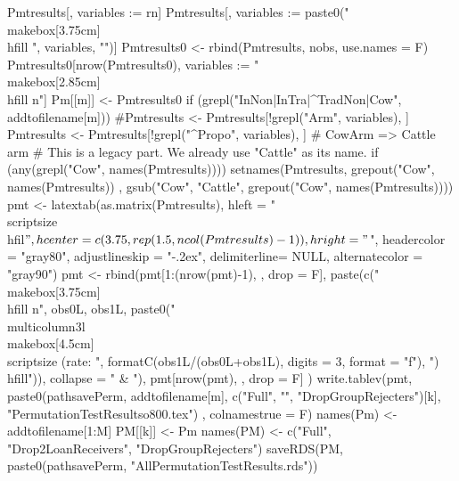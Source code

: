 \begin{Schunk}
\begin{Sinput}
{{    Pmtresults[, variables := rn]
    Pmtresults[, variables := paste0("\\makebox[3.75cm]{\\hfill ", variables, "}")]
    Pmtresults0 <- rbind(Pmtresults, nobs, use.names = F)
    Pmtresults0[nrow(Pmtresults0), variables := "\\makebox[2.85cm]{\\hfill n}"]
    Pm[[m]] <- Pmtresults0
    if (grepl("InNon|InTra|^TradNon|Cow", addtofilename[m]))
      #Pmtresults <- Pmtresults[!grepl("Arm", variables), ]
      Pmtresults <- Pmtresults[!grepl("^Propo", variables), ]
    # CowArm => Cattle arm
    # This is a legacy part. We already use "Cattle" as its name.
    if (any(grepl("Cow", names(Pmtresults)))) {
      setnames(Pmtresults, 
        grepout("Cow", names(Pmtresults))
        , gsub("Cow", "Cattle", grepout("Cow", names(Pmtresults))))
    }
    pmt <- latextab(as.matrix(Pmtresults), 
      hleft = "\\scriptsize\\hfil$", 
      hcenter = c(3.75, rep(1.5, ncol(Pmtresults)-1)), 
      hright = "$", 
      headercolor = "gray80", adjustlineskip = "-.2ex", delimiterline= NULL,
      alternatecolor = "gray90")
    pmt <- rbind(pmt[1:(nrow(pmt)-1), , drop = F], 
        paste(c("\\makebox[3.75cm]{\\hfill n}", 
         obs0L, obs1L, paste0("\\multicolumn{3}{l}{\\makebox[4.5cm]{\\scriptsize (rate: ", 
         formatC(obs1L/(obs0L+obs1L), digits = 3, format = "f"), ")\\hfill}}")), 
         collapse = " & "),
        pmt[nrow(pmt), , drop = F] 
      )
    write.tablev(pmt,  
      paste0(pathsavePerm, addtofilename[m], 
        c("Full", "", "DropGroupRejecters")[k], "PermutationTestResultso800.tex")
    , colnamestrue = F)
  }
  names(Pm) <- addtofilename[1:M]
  PM[[k]] <- Pm
}
names(PM) <- c("Full", "Drop2LoanReceivers", "DropGroupRejecters")
saveRDS(PM, paste0(pathsavePerm, "AllPermutationTestResults.rds"))
\end{Sinput}
\end{Schunk}
